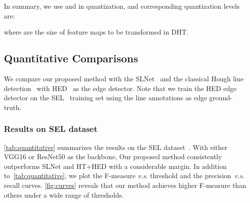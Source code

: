 \documentclass[10pt,journal,cspaper,compsoc]{IEEEtran}
\begin{document}
In summary, we use  and 
in quantization, and corresponding quantization levels are:

where  are the size of feature maps to be transformed in DHT.
\subsection{Quantitative Comparisons} \label{sec:quantitative}
We compare our proposed method with the SLNet~\cite{lee2017semantic}
and the classical Hough line detection~\cite{duda1971use} with HED~\cite{xie2015holistically}
as the edge detector.
Note that we train the HED edge detector on the SEL~\cite{lee2017semantic} training set
using the line annotations as edge ground-truth.

\subsubsection{Results on SEL dataset}
\cref{tab:quantitative} summarizes the results on the SEL dataset~\cite{lee2017semantic}.
With either VGG16 or ResNet50 as the backbone, Our proposed method consistently outperforms
SLNet and HT+HED with a considerable margin.
In addition to~\cref{tab:quantitative}, we plot the F-measure \emph{v.s.} threshold and
the precision~\emph{v.s.} recall curves.
\cref{fig:curves} reveals that our method achieves higher F-measure than others
under a wide range of thresholds.
\end{document}
